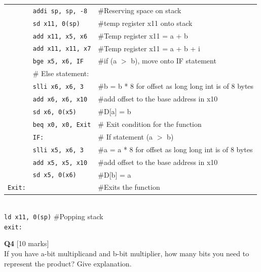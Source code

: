 \documentclass[addpoints]{exam}
\begin{document}
\begin{sloppypar}
\begin{questions}
\begin{solution}
        \begin{tabular}{c l l}
            & \texttt{addi sp, sp, -8} & \#Reserving space on stack \\
            & \texttt{sd x11, 0(sp)} & \#temp register x11 onto stack \\
            & \texttt{add x11, x5, x6} & \#Temp register x11 = a + b \\ 
            & \texttt{add x11, x11, x7} & \#Temp register x11 = a + b + i \\ 
            & \texttt{bge x5, x6, IF} & \#if (a $>$ b), move onto IF statement \\ 
            & \# Else statement: &  \\
            & \texttt{slli x6, x6, 3} & \#b = b * 8 for offset as long long int is of 8 bytes \\ 
            & \texttt{add x6, x6, x10} & \#add offset to the base address in x10 \\ 
            & \texttt{sd x6, 0(x5)} & \#D[a] = b \\ 
            & \texttt{beq x0, x0, Exit} & \# Exit condition for the function \\
            & \texttt{IF:}  & \# If statement (a $>$ b) \\ 
            & \texttt{slli x5, x6, 3} & \#a = a * 8 for offset as long long int is of 8 bytes \\ 
            & \texttt{add x5, x5, x10} & \#add offset to the base address in x10 \\ 
            & \texttt{sd x5, 0(x6)} & \#D[b] = a \\
            \texttt{Exit:} & & \#Exits the function  
        \end{tabular} \\ 
        \hspace*{1mm} \texttt{ld x11, 0(sp)} \hspace*{5mm} \#Popping stack \\
        \hspace*{1mm} \texttt{exit:}
    \end{solution}
    \newpage
    \question[10]\textbf{Q4} [10 marks] \\ 
    If you have a-bit multiplicand and b-bit multiplier, how many bits you need to represent the product? Give explanation.
    \begin{solution}

\end{solution}
\end{questions}
\end{sloppypar}
\end{document}

